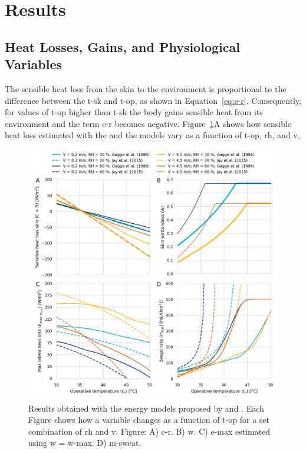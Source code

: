 
\section{Results}\label{sec:results}

\subsection{Heat Losses, Gains, and Physiological Variables}\label{subsec:res-heat-loss-physiological}

The sensible heat loss from the skin to the environment is proportional to the difference between the \ac{t-sk} and \ac{t-op}, as shown in Equation~\ref{eq:c-r}.
Consequently, for values of \ac{t-op} higher than \ac{t-sk} the body gains sensible heat from its environment and the term \ac{c-r} becomes negative.
Figure~\ref{fig:comparison_models}A shows how sensible heat loss estimated with the  and the  models vary as a function of \ac{t-op}, \ac{rh}, and \ac{v}.

\begin{figure}[thb!]
    \centering
    \includegraphics[width=\textwidth]{figures/comparison_models_v2}
    \caption{Results obtained with the energy models proposed by  and .
    Each Figure shows how a variable changes as a function of \ac{t-op} for a set combination of \ac{rh} and \ac{v}.
    Figure: A) \Acf{c-r}.
    B) \Acf{w}.
    C) \Acf{e-max} estimated using \ac{w} = \ac{w-max}.
    D) \Acf{m-sweat}.}
    \label{fig:comparison_models}
\end{figure}

